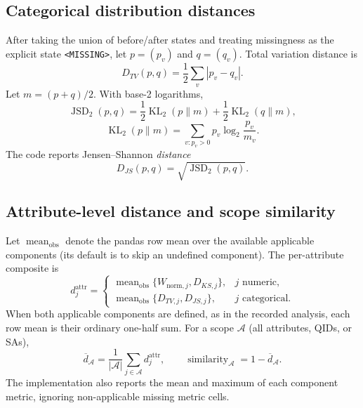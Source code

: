 \documentclass[11pt,a4paper]{article}
\newcommand{\card}[1]{\left\lvert #1\right\rvert}
\newcommand{\code}[1]{\texttt{#1}}
\DeclareMathOperator{\KL}{KL}
\DeclareMathOperator{\JSD}{JSD}
\begin{document}
\subsection{Categorical distribution distances}

After taking the union of before/after states and treating missingness as the
explicit state \code{<MISSING>}, let $p=(p_v)$ and $q=(q_v)$.  Total variation
distance is
\begin{equation}
D_{TV}(p,q)=\frac12\sum_v|p_v-q_v|.
\tag{76}
\end{equation}
Let $m=(p+q)/2$.  With base-2 logarithms,
\begin{equation}
\JSD_2(p,q)=\frac12\KL_2(p\|m)+\frac12\KL_2(q\|m),
\tag{77}
\end{equation}
\begin{equation}
\KL_2(p\|m)=\sum_{v:p_v>0}p_v\log_2\frac{p_v}{m_v}.
\tag{78}
\end{equation}
The code reports Jensen--Shannon \emph{distance}
\begin{equation}
D_{JS}(p,q)=\sqrt{\JSD_2(p,q)}.
\tag{79}
\end{equation}

\subsection{Attribute-level distance and scope similarity}

Let $\operatorname{mean}_{\mathrm{obs}}$ denote the pandas row mean over the
available applicable components (its default is to skip an undefined component).
The per-attribute composite is
\begin{equation}
d_j^{\mathrm{attr}}=
\begin{cases}
\operatorname{mean}_{\mathrm{obs}}
  \{W_{\mathrm{norm},j},D_{KS,j}\},
&j\text{ numeric},\\[2mm]
\operatorname{mean}_{\mathrm{obs}}
  \{D_{TV,j},D_{JS,j}\},
&j\text{ categorical}.
\end{cases}
\tag{80}
\end{equation}
When both applicable components are defined, as in the recorded analysis, each
row mean is their ordinary one-half sum.
For a scope $\mathcal A$ (all attributes, QIDs, or SAs),
\begin{equation}
\overline d_{\mathcal A}
=\frac1{\card{\mathcal A}}\sum_{j\in\mathcal A}d_j^{\mathrm{attr}},
\qquad
\operatorname{similarity}_{\mathcal A}=1-\overline d_{\mathcal A}.
\tag{81}
\end{equation}
The implementation also reports the mean and maximum of each component metric,
ignoring non-applicable missing metric cells.
\end{document}
